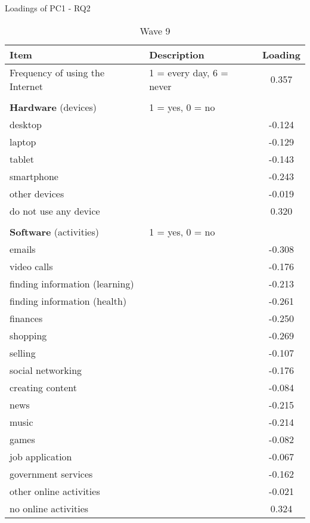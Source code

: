 \documentclass[12pt]{article}
\begin{document}
    \begin{table}[h!]
        \centering
        \caption{Loadings of PC1 - RQ2}
        \label{tab:pc1_loadings_rq2}

        \begin{subtable}{\textwidth}
            \centering
            \caption{Wave 9}
            \begin{tabular}{llc}
                \toprule
                Item & Description & Loading \\
                \midrule
                Frequency of using the Internet & 1 = every day, 6 = never & 0.357 \\
                & & \\
                \textbf{Hardware} (devices) & 1 = yes, 0 = no & \\
                desktop &  & -0.124 \\
                laptop &  & -0.129 \\
                tablet &  & -0.143 \\
                smartphone &  & -0.243 \\
                other devices &  & -0.019 \\
                do not use any device &  & 0.320 \\
                & & \\
                \textbf{Software} (activities) & 1 = yes, 0 = no & \\
                emails &  & -0.308 \\
                video calls &  & -0.176 \\
                finding information (learning) &  & -0.213 \\
                finding information (health) &  & -0.261 \\
                finances &  & -0.250 \\
                shopping &  & -0.269 \\
                selling &  & -0.107 \\
                social networking &  & -0.176 \\
                creating content &  & -0.084 \\
                news &  & -0.215 \\
                music &  & -0.214 \\
                games &  & -0.082 \\
                job application &  & -0.067 \\
                government services &  & -0.162 \\
                other online activities &  & -0.021 \\
                no online activities &  & 0.324 \\
                \bottomrule
            \end{tabular}
        \end{subtable}


\end{table}
\end{document}
